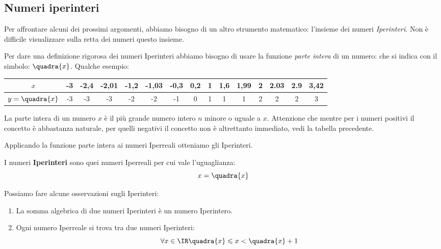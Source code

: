 

\subsection{Numeri iperinteri}
\label{subsec:cont_iperinteri}

Per affrontare alcuni dei prossimi argomenti, abbiamo bisogno di un altro 
strumento matematico: l'insieme dei numeri \emph{Iperinteri}.
Non è difficile visualizzare sulla retta dei numeri questo insieme.

Per dare una definizione rigorosa dei numeri Iperinteri abbiamo bisogno di 
usare la funzione \emph{parte intera} di un numero: che si indica con il 
simbolo:
\(\quadra{x}\). Qualche esempio:
\begin{center}
\begin{tabular}{ccccccccccccccc}
\(x\) & 
-3&-2,4&-2,01&-1,2&-1,03&-0,3&0,2&1&1,6&1,99&2&2.03&2.9&3,42\\
\hline
\(y=\quadra{x}\) & 
-3&-3  &-3   &-2  &-2   &-1  &0  &1&1  &1   &2&2   &2  &3
\end{tabular}
\end{center}

\begin{minipage}{.59\textwidth}
La parte intera di un numero \(x\) è il più grande numero intero \(n\) 
minore o uguale a \(x\). Attenzione che mentre per i numeri positivi il 
concetto è abbastanza naturale, per quelli negativi il concetto non è 
altrettanto immediato, vedi la tabella precedente.

Applicando la funzione parte intera ai numeri Iperreali otteniamo gli 
Iperinteri.
\end{minipage}
\hfill
\begin{minipage}{.39\textwidth}
\begin{center}
\parteintera
\end{center}
\end{minipage}

\begin{definizione}
 I numeri \textbf{Iperinteri} sono quei numeri Iperreali per cui vale 
l'uguaglianza:
 \[x=\quadra{x}\]
\end{definizione}

Possiamo fare alcune osservazioni sugli Iperinteri:

\begin{enumerate}
 \item 
La somma algebrica di due numeri Iperinteri è un numero Iperintero.
 \item 
Ogni numero Iperreale si trova tra due numeri Iperinteri:
\[\forall x \in \IR \quadra{x} \leqslant x < \quadra{x}+1\]
\end{enumerate}

